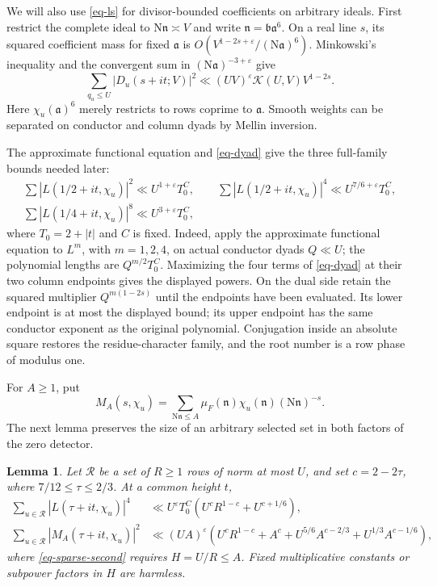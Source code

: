 \documentclass[11pt,a4paper]{article}
\numberwithin{equation}{section}
\newtheorem{lemma}[theorem]{Lemma}
\theoremstyle{remark}
\newcommand{\eps}{\varepsilon}
\newcommand{\K}{\mathcal K}
\newcommand{\R}{\mathcal R}
\newcommand{\N}{\mathrm N}
\begin{document}
We will also use \eqref{eq-ls} for divisor-bounded coefficients
on arbitrary ideals.  First restrict the complete ideal to
$\N\mathfrak n\asymp V$ and write
$\mathfrak n=\mathfrak b\mathfrak a^6$.  On a real line $s$, its
squared coefficient mass for fixed $\mathfrak a$ is
$O(V^{1-2s+\eps}/(\N\mathfrak a)^6)$.  Minkowski's inequality
and the convergent sum in $(\N\mathfrak a)^{-3+\eps}$ give
\begin{equation}\label{eq-dyad}
 \sum_{q_u\le U}|D_u(s+it;V)|^2
 \ll(UV)^\eps\K(U,V)V^{1-2s}.
\end{equation}
Here $\chi_u(\mathfrak a)^6$ merely restricts to rows coprime
to $\mathfrak a$.  Smooth weights can be separated on conductor
and column dyads by Mellin inversion.

The approximate functional equation and \eqref{eq-dyad} give
the three full-family bounds needed later:
\begin{equation}\label{eq-standard-moments}
\begin{gathered}
 \sum|L(1/2+it,\chi_u)|^2\ll U^{1+\eps}T_0^C,\qquad
 \sum|L(1/2+it,\chi_u)|^4\ll U^{7/6+\eps}T_0^C,\\
 \sum|L(1/4+it,\chi_u)|^8\ll U^{3+\eps}T_0^C,
\end{gathered}
\end{equation}
where $T_0=2+|t|$ and $C$ is fixed.  Indeed, apply the approximate functional
equation to $L^m$, with $m=1,2,4$, on actual conductor dyads
$Q\ll U$; the polynomial lengths are $Q^{m/2}T_0^C$.
Maximizing the four terms of \eqref{eq-dyad} at their two column
endpoints gives the displayed powers.  On the dual side retain
the squared multiplier $Q^{m(1-2s)}$ until the endpoints have
been evaluated.  Its lower endpoint is at most the displayed
bound; its upper endpoint has the same conductor exponent as
the original polynomial.  Conjugation inside an absolute square
restores the residue-character family, and the root number is
a row phase of modulus one.

For $A\ge1$, put
\[
 M_A(s,\chi_u)=\sum_{\N\mathfrak n\le A}
       \mu_F(\mathfrak n)\chi_u(\mathfrak n)(\N\mathfrak n)^{-s}.
\]
The next lemma preserves the size of an arbitrary selected set
in both factors of the zero detector.

\begin{lemma}\label{lem-sparse}
Let $\R$ be a set of $R\ge1$ rows of norm at most $U$, and set
$c=2-2\tau$, where $7/12\le\tau\le2/3$.  At a common height $t$,
\begin{align}
 \sum_{u\in\R}|L(\tau+it,\chi_u)|^4
 &\ll U^\eps T_0^C
       \left(U^cR^{1-c}+U^{c+1/6}\right),\label{eq-sparse-fourth}\\
 \sum_{u\in\R}|M_A(\tau+it,\chi_u)|^2
 &\ll(UA)^\eps\left(U^cR^{1-c}+A^c+
 U^{5/6}A^{c-2/3}+U^{1/3}A^{c-1/6}\right),\label{eq-sparse-second}
\end{align}
where \eqref{eq-sparse-second} requires $H=U/R\le A$.
Fixed multiplicative constants or subpower factors in $H$ are harmless.
\end{lemma}
\end{document}

